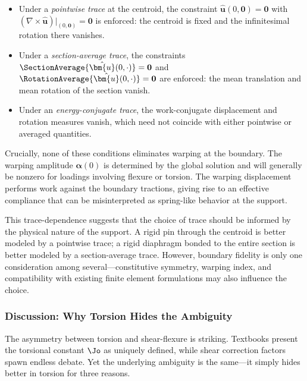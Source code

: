 \begin{itemize}
\item Under a \emph{pointwise trace} at the centroid, the constraint 
$\hat{\bm{u}}(0, \mathbf{0}) = \mathbf{0}$ with 
$(\nabla \times \hat{\bm{u}})|_{(0,\mathbf{0})} = \mathbf{0}$ is enforced: 
the centroid is fixed and the infinitesimal rotation there vanishes.

\item Under a \emph{section-average trace}, the constraints 
$\SectionAverage{\hat{\bm{u}}(0,\cdot)} = \mathbf{0}$ and 
$\RotationAverage{\hat{\bm{u}}(0,\cdot)} = \mathbf{0}$ are enforced: 
the mean translation and mean rotation of the section vanish.

\item Under an \emph{energy-conjugate trace}, the work-conjugate displacement 
and rotation measures vanish, which need not coincide with either pointwise 
or averaged quantities.
\end{itemize}

Crucially, none of these conditions eliminates warping at the boundary. The 
warping amplitude $\bm{\alpha}(0)$ is determined by the global solution and 
will generally be nonzero for loadings involving flexure or torsion. The 
warping displacement performs work against the boundary tractions, giving 
rise to an effective compliance that can be misinterpreted as spring-like 
behavior at the support.

This trace-dependence suggests that the choice of trace should be informed 
by the physical nature of the support. A rigid pin through the centroid is 
better modeled by a pointwise trace; a rigid diaphragm bonded to the entire 
section is better modeled by a section-average trace. However, boundary 
fidelity is only one consideration among several---constitutive symmetry, 
warping index, and compatibility with existing finite element formulations 
may also influence the choice.


\subsubsection{Discussion: Why Torsion Hides the Ambiguity}

The asymmetry between torsion and shear-flexure is striking. Textbooks present 
the torsional constant $\Jo$ as uniquely defined, while shear correction 
factors spawn endless debate. Yet the underlying ambiguity is the same---it 
simply hides better in torsion for three reasons.

